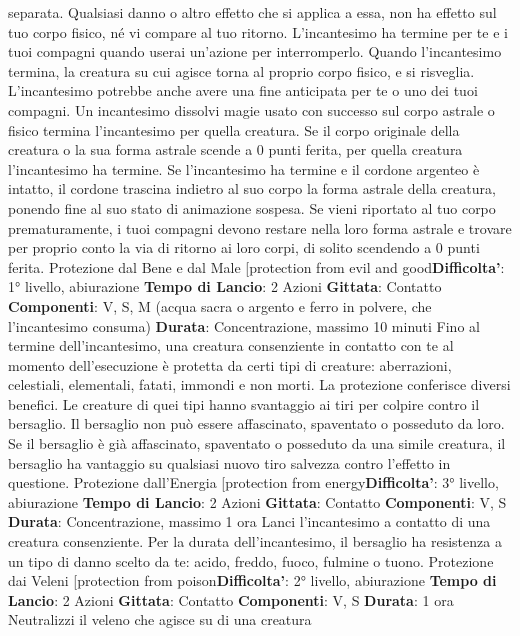 \begin{multicols}{2}
separata. Qualsiasi danno o altro effetto che si applica
a essa, non ha effetto sul tuo corpo fisico, né vi
compare al tuo ritorno.
L’incantesimo ha termine per te e i tuoi compagni
quando userai un’azione per interromperlo. Quando
l’incantesimo termina, la creatura su cui agisce torna al
proprio corpo fisico, e si risveglia.
L’incantesimo potrebbe anche avere una fine anticipata
per te o uno dei tuoi compagni. Un incantesimo dissolvi
magie usato con successo sul corpo astrale o fisico
termina l’incantesimo per quella creatura. Se il corpo
originale della creatura o la sua forma astrale scende a
0 punti ferita, per quella creatura l’incantesimo ha
termine. Se l’incantesimo ha termine e il cordone
argenteo è intatto, il cordone trascina indietro al suo
corpo la forma astrale della creatura, ponendo fine al
suo stato di animazione sospesa.
Se vieni riportato al tuo corpo prematuramente, i tuoi
compagni devono restare nella loro forma astrale e
trovare per proprio conto la via di ritorno ai loro corpi, di
solito scendendo a 0 punti ferita.
Protezione dal Bene e dal Male
[protection from evil and good\textbf{Difficolta'}:
1° livello, abiurazione
\textbf{Tempo di Lancio}: 2 Azioni
\textbf{Gittata}: Contatto
\textbf{Componenti}: V, S, M (acqua sacra o argento e ferro in
polvere, che l’incantesimo consuma)
\textbf{Durata}: Concentrazione, massimo 10 minuti
Fino al termine dell’incantesimo, una creatura
consenziente in contatto con te al momento
dell’esecuzione è protetta da certi tipi di creature:
aberrazioni, celestiali, elementali, fatati, immondi e non
morti.
La protezione conferisce diversi benefici. Le creature di
quei tipi hanno svantaggio ai tiri per colpire contro il
bersaglio. Il bersaglio non può essere affascinato,
spaventato o posseduto da loro. Se il bersaglio è già
affascinato, spaventato o posseduto da una simile
creatura, il bersaglio ha vantaggio su qualsiasi nuovo
tiro salvezza contro l’effetto in questione.
Protezione dall’Energia
[protection from energy\textbf{Difficolta'}:
3° livello, abiurazione
\textbf{Tempo di Lancio}: 2 Azioni
\textbf{Gittata}: Contatto
\textbf{Componenti}: V, S
\textbf{Durata}: Concentrazione, massimo 1 ora
Lanci l’incantesimo a contatto di una creatura
consenziente. Per la durata dell’incantesimo, il
bersaglio ha resistenza a un tipo di danno scelto da te:
acido, freddo, fuoco, fulmine o tuono.
Protezione dai Veleni
[protection from poison\textbf{Difficolta'}:
2° livello, abiurazione
\textbf{Tempo di Lancio}: 2 Azioni
\textbf{Gittata}: Contatto
\textbf{Componenti}: V, S
\textbf{Durata}: 1 ora
Neutralizzi il veleno che agisce su di una creatura

\end{multicols}
